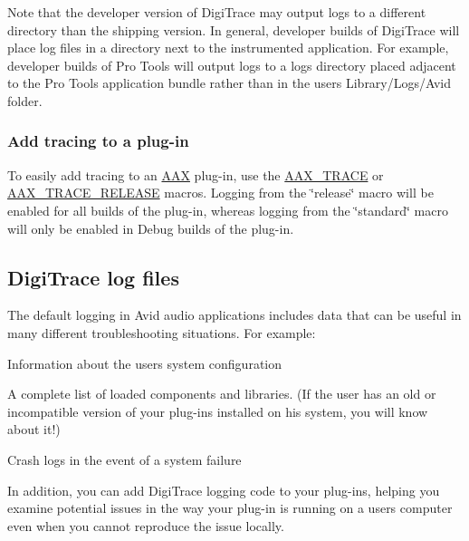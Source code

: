  Note that the developer version of Digi\+Trace may output logs to a different directory than the shipping version. In general, developer builds of Digi\+Trace will place log files in a directory next to the instrumented application. For example, developer builds of Pro Tools will output logs to a logs directory placed adjacent to the Pro Tools application bundle rather than in the user\textquotesingle{}s Library/\+Logs/\+Avid folder.

\hypertarget{a00834_digitrace__gettingstarted__addingtracing}{}\subsubsection{Add tracing to a plug-\/in}\label{a00834_digitrace__gettingstarted__addingtracing}
 To easily add tracing to an \mbox{\hyperlink{a00852}{A\+AX}} plug-\/in, use the \mbox{\hyperlink{a00395_ab53f1d6a94f8b6ebb3a101f71bfe4e82}{A\+A\+X\+\_\+\+T\+R\+A\+CE}} or \mbox{\hyperlink{a00395_ac2aa820ece56bb59140ad561218db4b3}{A\+A\+X\+\_\+\+T\+R\+A\+C\+E\+\_\+\+R\+E\+L\+E\+A\+SE}} macros. Logging from the \char`\"{}release\char`\"{} macro will be enabled for all builds of the plug-\/in, whereas logging from the \char`\"{}standard\char`\"{} macro will only be enabled in Debug builds of the plug-\/in.



 \hypertarget{a00834_digitrace__logfiles}{}\subsection{Digi\+Trace log files}\label{a00834_digitrace__logfiles}
 The default logging in Avid audio applications includes data that can be useful in many different troubleshooting situations. For example\+:


\begin{DoxyItemize}
\item Information about the user\textquotesingle{}s system configuration
\item A complete list of loaded components and libraries. (If the user has an old or incompatible version of your plug-\/ins installed on his system, you will know about it!)
\item Crash logs in the event of a system failure
\end{DoxyItemize}

 In addition, you can add Digi\+Trace logging code to your plug-\/ins, helping you examine potential issues in the way your plug-\/in is running on a user\textquotesingle{}s computer even when you cannot reproduce the issue locally.

